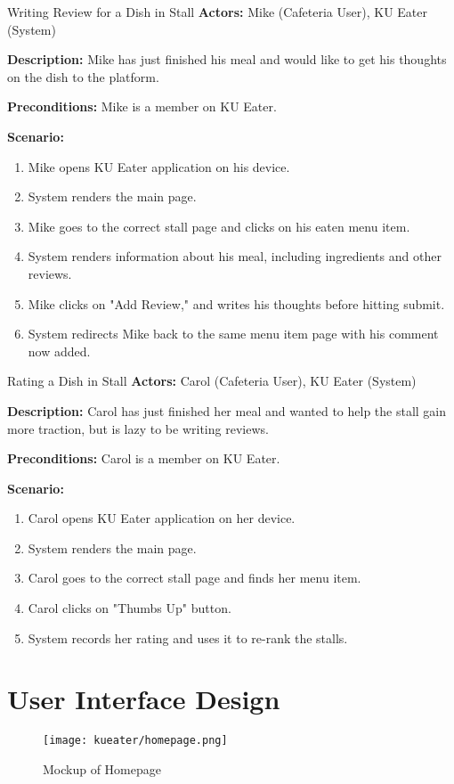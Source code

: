 \begin{usecase}{Writing Review for a Dish in Stall}
    \textbf{Actors:} Mike (Cafeteria User), KU Eater (System)

    \textbf{Description:} Mike has just finished his meal and would like to get his thoughts on the dish to the platform.

    \textbf{Preconditions:} Mike is a member on KU Eater.

    \textbf{Scenario:}

    \begin{enumerate}[leftmargin=80pt]
        \item Mike opens KU Eater application on his device.
        \item System renders the main page.
        \item Mike goes to the correct stall page and clicks on his eaten menu item.
        \item System renders information about his meal, including ingredients and other reviews.
        \item Mike clicks on "Add Review," and writes his thoughts before hitting submit.
        \item System redirects Mike back to the same menu item page with his comment now added.
    \end{enumerate}
\end{usecase}

\begin{usecase}{Rating a Dish in Stall}
    \textbf{Actors:} Carol (Cafeteria User), KU Eater (System)

    \textbf{Description:} Carol has just finished her meal and wanted to help the stall gain more traction, but is lazy to be writing reviews.

    \textbf{Preconditions:} Carol is a member on KU Eater.

    \textbf{Scenario:}

    \begin{enumerate}[leftmargin=80pt]
        \item Carol opens KU Eater application on her device.
        \item System renders the main page.
        \item Carol goes to the correct stall page and finds her menu item.
        \item Carol clicks on "Thumbs Up" button.
        \item System records her rating and uses it to re-rank the stalls.
    \end{enumerate}
\end{usecase}


\section{User Interface Design}
\label{section:user-interface-design}

\begin{figure}[h!]
    \centering
    \texttt{[image: kueater/homepage.png]}
    \caption{Mockup of Homepage}
    \vspace*{-\baselineskip}
\end{figure}